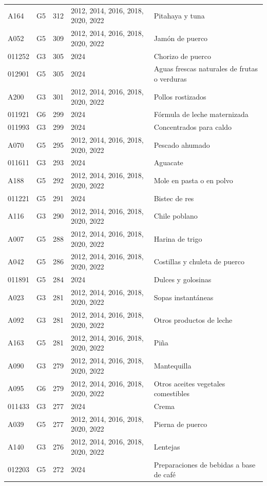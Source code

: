 \begin{table}[ht]
\begin{tabular}{llrll}
  A164 & G5 & 312 & 2012, 2014, 2016, 2018, 2020, 2022 & Pitahaya y tuna \\ 
  A052 & G5 & 309 & 2012, 2014, 2016, 2018, 2020, 2022 & Jamón de puerco \\ 
  011252 & G3 & 305 & 2024 & Chorizo de puerco \\ 
  012901 & G5 & 305 & 2024 & Aguas frescas naturales de frutas o verduras \\ 
  A200 & G3 & 301 & 2012, 2014, 2016, 2018, 2020, 2022 & Pollos rostizados \\ 
  011921 & G6 & 299 & 2024 & Fórmula de leche maternizada \\ 
  011993 & G3 & 299 & 2024 & Concentrados para caldo \\ 
  A070 & G5 & 295 & 2012, 2014, 2016, 2018, 2020, 2022 & Pescado ahumado \\ 
  011611 & G3 & 293 & 2024 & Aguacate \\ 
  A188 & G5 & 292 & 2012, 2014, 2016, 2018, 2020, 2022 & Mole en pasta o en polvo \\ 
  011221 & G5 & 291 & 2024 & Bistec de res \\ 
  A116 & G3 & 290 & 2012, 2014, 2016, 2018, 2020, 2022 & Chile poblano \\ 
  A007 & G5 & 288 & 2012, 2014, 2016, 2018, 2020, 2022 & Harina de trigo \\ 
  A042 & G5 & 286 & 2012, 2014, 2016, 2018, 2020, 2022 & Costillas y chuleta de puerco \\ 
  011891 & G5 & 284 & 2024 & Dulces y golosinas \\ 
  A023 & G3 & 281 & 2012, 2014, 2016, 2018, 2020, 2022 & Sopas instantáneas \\ 
  A092 & G3 & 281 & 2012, 2014, 2016, 2018, 2020, 2022 & Otros productos de leche \\ 
  A163 & G5 & 281 & 2012, 2014, 2016, 2018, 2020, 2022 & Piña \\ 
  A090 & G3 & 279 & 2012, 2014, 2016, 2018, 2020, 2022 & Mantequilla \\ 
  A095 & G6 & 279 & 2012, 2014, 2016, 2018, 2020, 2022 & Otros aceites vegetales comestibles \\ 
  011433 & G3 & 277 & 2024 & Crema \\ 
  A039 & G5 & 277 & 2012, 2014, 2016, 2018, 2020, 2022 & Pierna de puerco \\ 
  A140 & G3 & 276 & 2012, 2014, 2016, 2018, 2020, 2022 & Lentejas \\ 
  012203 & G5 & 272 & 2024 & Preparaciones de bebidas a base de café \\ 

\end{tabular}
\end{table}
